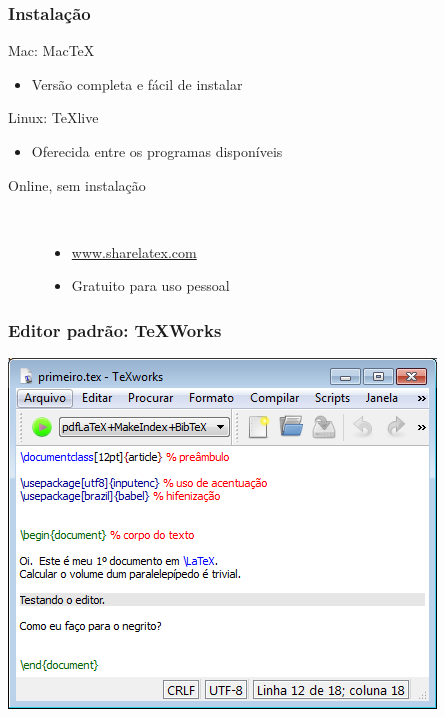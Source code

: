 \begin{frame}
  \frametitle{Instalação}

  \begin{block}{Mac: Mac\TeX}
    \begin{itemize}
    \item Versão completa e fácil de instalar
    \end{itemize}
  \end{block}
  
  \begin{block}{Linux: \TeX live}
    \begin{itemize}
    \item Oferecida entre os programas disponíveis
    \end{itemize}
  \end{block}

  \begin{block}{Online, sem instalação}
    \begin{description}
    \item[]\
      \begin{itemize}
      \item \url{www.sharelatex.com}
      \item Gratuito para uso pessoal
      \end{itemize}
    \end{description}
  \end{block}


\end{frame}


\begin{frame}
  \frametitle{Editor padrão: TeXWorks}
  
  \centering
  \includegraphics[scale=0.5]{./imagens/texworks-janela.png}

\end{frame}

